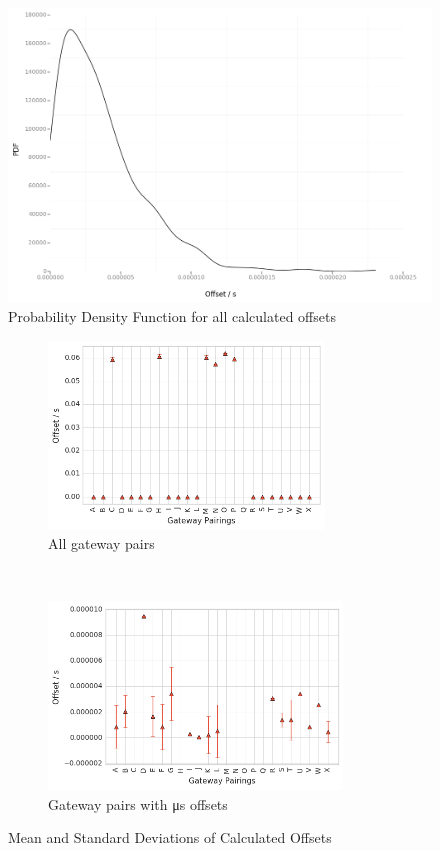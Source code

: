\documentclass[a4paper]{report}
\begin{document}
    \begin{figure}[ht]
    \centering
    \includegraphics[width=12cm]{figures/offsetpdf.png}
    \caption{Probability Density Function for all calculated offsets}
    \label{fig:offsetpdf}
    \end{figure}

    \begin{figure}[ht]
    \centering
    \begin{subfigure}[b]{7cm}
        \includegraphics[height=5cm]{figures/offsetsall.png}
        \caption{All gateway pairs}
        \label{fig:offsetboxesa}
    \end{subfigure}
    ~
    \begin{subfigure}[b]{7cm}
        \includegraphics[height=5cm]{figures/offsetssmall.png}
        \caption{Gateway pairs with \si{\micro\second} offsets}
        \label{fig:offsetboxesb}
    \end{subfigure}
    \caption{Mean and Standard Deviations of Calculated Offsets} \label{fig:offsetboxes}
    \end{figure}
\end{document}
